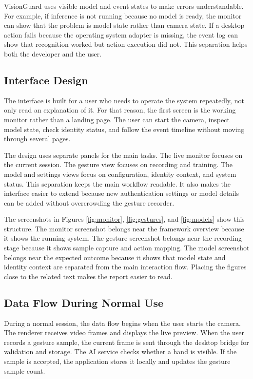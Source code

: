 \documentclass[10pt,twocolumn]{article}
\begin{document}
VisionGuard uses visible model and event states to make errors understandable.
For example, if inference is not running because no model is ready, the monitor can show that the problem is model state rather than camera state.
If a desktop action fails because the operating system adapter is missing, the event log can show that recognition worked but action execution did not.
This separation helps both the developer and the user.

\subsection{Interface Design}
The interface is built for a user who needs to operate the system repeatedly, not only read an explanation of it.
For that reason, the first screen is the working monitor rather than a landing page.
The user can start the camera, inspect model state, check identity status, and follow the event timeline without moving through several pages.

The design uses separate panels for the main tasks.
The live monitor focuses on the current session.
The gesture view focuses on recording and training.
The model and settings views focus on configuration, identity context, and system status.
This separation keeps the main workflow readable.
It also makes the interface easier to extend because new authentication settings or model details can be added without overcrowding the gesture recorder.

The screenshots in Figures \ref{fig:monitor}, \ref{fig:gestures}, and \ref{fig:models} show this structure.
The monitor screenshot belongs near the framework overview because it shows the running system.
The gesture screenshot belongs near the recording stage because it shows sample capture and action mapping.
The model screenshot belongs near the expected outcome because it shows that model state and identity context are separated from the main interaction flow.
Placing the figures close to the related text makes the report easier to read.

\subsection{Data Flow During Normal Use}
During a normal session, the data flow begins when the user starts the camera.
The renderer receives video frames and displays the live preview.
When the user records a gesture sample, the current frame is sent through the desktop bridge for validation and storage.
The AI service checks whether a hand is visible.
If the sample is accepted, the application stores it locally and updates the gesture sample count.
\end{document}
